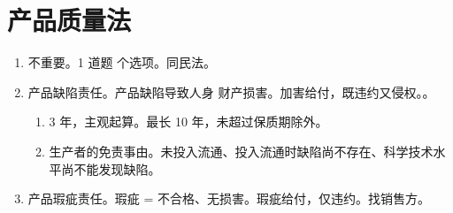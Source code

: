 \section{产品质量法}
\begin{enumerate}
  \item 不重要。1 道题  个选项。同民法。
  \item 产品缺陷责任。产品缺陷导致人身 \hz 财产损害。加害给付，既违约又侵权。。
        \begin{enumerate}
          \item 3 年，主观起算。最长 10 年，未超过保质期除外。
          \item 生产者的免责事由。未投入流通、投入流通时缺陷尚不存在、科学技术水平尚不能发现缺陷。
        \end{enumerate}
  \item 产品瑕疵责任。瑕疵 = 不合格、无损害。瑕疵给付，仅违约。找销售方。
\end{enumerate}
